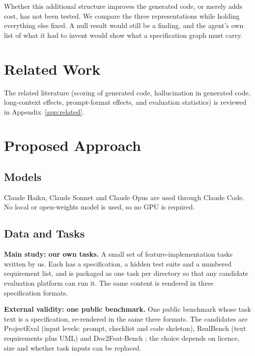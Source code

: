 \documentclass{article}
\begin{document}
Whether this additional structure improves the generated code, or merely adds cost, has not been tested.
We compare the three representations while holding everything else fixed. A null result would still be a
finding, and the agent's own list of what it had to invent would show what a specification graph must carry.

\section{Related Work}\label{sec:related}
The related literature (scoring of generated code, hallucination in generated code, long-context effects, prompt-format effects, and evaluation statistics) is reviewed in Appendix~\ref{app:related}.

\section{Proposed Approach}

\subsection{Models}
Claude Haiku, Claude Sonnet and Claude Opus are used through Claude Code.
No local or open-weights model is used, so no GPU is required.

\subsection{Data and Tasks}

\textbf{Main study: our own tasks.} A small set of feature-implementation tasks written by us. Each has a specification,
a hidden test suite and a numbered requirement list, and is packaged as one task per directory so that any candidate
evaluation platform can run it. The same content is rendered in three specification formats.

\textbf{External validity: one public benchmark.} One public benchmark whose task text is a specification, re-rendered in the
same three formats. The candidates are ProjectEval \citep{liu2025projecteval} (input levels: prompt, checklist and code skeleton),
RealBench \citep{li2026realbench} (text requirements plus UML) and Doc2Feat-Bench \citep{jiang2025doc2feat}; the choice depends on
licence, size and whether task inputs can be replaced.
\end{document}

